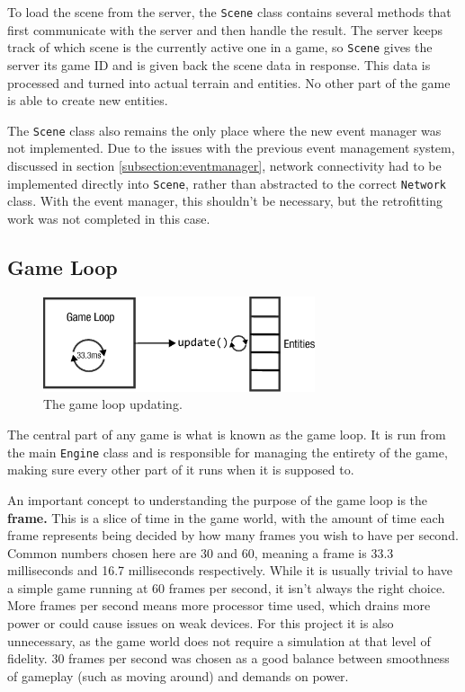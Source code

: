 To load the scene from the server, the \texttt{Scene} class contains several methods that first communicate with the server and then handle the result. The server keeps track of which scene is the currently active one in a game, so \texttt{Scene} gives the server its game ID and is given back the scene data in response. This data is processed and turned into actual terrain and entities. No other part of the game is able to create new entities.

The \texttt{Scene} class also remains the only place where the new event manager was not implemented. Due to the issues with the previous event management system, discussed in section \ref{subsection:eventmanager}, network connectivity had to be implemented directly into \texttt{Scene}, rather than abstracted to the correct \texttt{Network} class. With the event manager, this shouldn't be necessary, but the retrofitting work was not completed in this case.

\subsection{Game Loop}

\begin{figure}[H]
	\centering
	\includegraphics[width=8cm]{Images/game_loop.eps}
	\caption{The game loop updating.}
    \label{fig:gameloop}
\end{figure}

The central part of any game is what is known as the game loop. It is run from the main \texttt{Engine} class and is responsible for managing the entirety of the game, making sure every other part of it runs when it is supposed to.

An important concept to understanding the purpose of the game loop is the \textbf{frame.} This is a slice of time in the game world, with the amount of time each frame represents being decided by how many frames you wish to have per second. Common numbers chosen here are 30 and 60, meaning a frame is 33.3 milliseconds and 16.7 milliseconds respectively. While it is usually trivial to have a simple game running at 60 frames per second, it isn't always the right choice. More frames per second means more processor time used, which drains more power or could cause issues on weak devices. For this project it is also unnecessary, as the game world does not require a simulation at that level of fidelity. 30 frames per second was chosen as a good balance between smoothness of gameplay (such as moving around) and demands on power.

